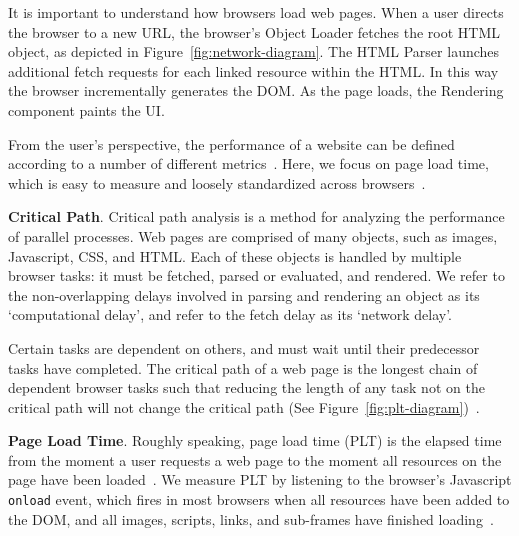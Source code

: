 It is important to understand how browsers load web pages. When a user directs the browser to a new URL, the browser's Object Loader fetches the root HTML object, as depicted
in Figure~\ref{fig:network-diagram}. The HTML Parser launches additional
fetch requests for each linked resource within the HTML. In this way the browser incrementally generates the DOM.
As the page loads, the Rendering component paints the UI.

From the user's perspective, the performance of a website can be defined according to a number of different metrics~\cite{above-the-fold,speed-index}. Here,
we focus on page load time, which is easy to measure
and loosely standardized across browsers~\cite{w3c-onload}.

\textbf{Critical Path}. Critical path analysis is a method for analyzing the performance of parallel processes. Web pages are comprised of many objects, such as images, Javascript, CSS, and HTML.
Each of these objects is handled by multiple browser tasks: it must be
fetched, parsed or evaluated, and rendered. We refer to the non-overlapping
delays involved in parsing and rendering an object as its `computational
delay', and refer to the fetch delay as its `network delay'.

Certain tasks are dependent on others, and must wait until their
predecessor tasks have completed. The critical path of a web page is the longest chain of dependent browser tasks such that reducing the length of any task not on the critical
path will not change the critical path (See Figure~\ref{fig:plt-diagram})~\cite{sarkar1987partitioning}.


\textbf{Page Load Time}. Roughly speaking, page load time (PLT) is the elapsed time from the moment a user requests a web page to the moment all resources on the page have been loaded~\cite{page-speed}.
We measure PLT by listening to the browser's Javascript \texttt{onload} event,
which fires in most browsers when all resources have been added to the DOM, and all images,
scripts, links, and sub-frames have finished loading~\cite{w3c-onload}.


